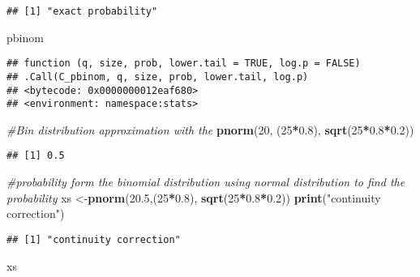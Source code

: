 \documentclass[
]{article}
\newenvironment{Shaded}{\begin{snugshade}}{\end{snugshade}}
\newcommand{\CommentTok}[1]{\textcolor[rgb]{0.56,0.35,0.01}{\textit{#1}}}
\newcommand{\DecValTok}[1]{\textcolor[rgb]{0.00,0.00,0.81}{#1}}
\newcommand{\FloatTok}[1]{\textcolor[rgb]{0.00,0.00,0.81}{#1}}
\newcommand{\KeywordTok}[1]{\textcolor[rgb]{0.13,0.29,0.53}{\textbf{#1}}}
\newcommand{\NormalTok}[1]{#1}
\newcommand{\OperatorTok}[1]{\textcolor[rgb]{0.81,0.36,0.00}{\textbf{#1}}}
\newcommand{\StringTok}[1]{\textcolor[rgb]{0.31,0.60,0.02}{#1}}
\begin{document}
\begin{verbatim}
## [1] "exact probability"
\end{verbatim}

\begin{Shaded}
\begin{Highlighting}[]
\NormalTok{pbinom }
\end{Highlighting}
\end{Shaded}

\begin{verbatim}
## function (q, size, prob, lower.tail = TRUE, log.p = FALSE) 
## .Call(C_pbinom, q, size, prob, lower.tail, log.p)
## <bytecode: 0x0000000012eaf680>
## <environment: namespace:stats>
\end{verbatim}

\begin{Shaded}
\begin{Highlighting}[]
\CommentTok{#Bin distribution approximation with the }
\KeywordTok{pnorm}\NormalTok{(}\DecValTok{20}\NormalTok{, (}\DecValTok{25}\OperatorTok{*}\FloatTok{0.8}\NormalTok{), }\KeywordTok{sqrt}\NormalTok{(}\DecValTok{25}\OperatorTok{*}\FloatTok{0.8}\OperatorTok{*}\FloatTok{0.2}\NormalTok{))}
\end{Highlighting}
\end{Shaded}

\begin{verbatim}
## [1] 0.5
\end{verbatim}

\begin{Shaded}
\begin{Highlighting}[]
\CommentTok{#probability form the binomial distribution using normal distribution to find the probability}
\NormalTok{xs <-}\KeywordTok{pnorm}\NormalTok{(}\FloatTok{20.5}\NormalTok{,(}\DecValTok{25}\OperatorTok{*}\FloatTok{0.8}\NormalTok{), }\KeywordTok{sqrt}\NormalTok{(}\DecValTok{25}\OperatorTok{*}\FloatTok{0.8}\OperatorTok{*}\FloatTok{0.2}\NormalTok{))}
\KeywordTok{print}\NormalTok{(}\StringTok{"continuity correction"}\NormalTok{)}
\end{Highlighting}
\end{Shaded}

\begin{verbatim}
## [1] "continuity correction"
\end{verbatim}

\begin{Shaded}
\begin{Highlighting}[]
\NormalTok{xs }
\end{Highlighting}
\end{Shaded}
\end{document}
